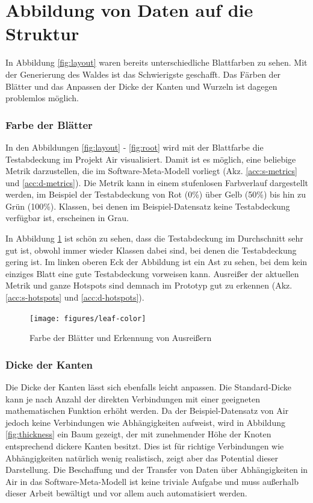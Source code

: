 \section{Abbildung von Daten auf die Struktur}
\label{sec:data}

In Abbildung \ref{fig:layout} waren bereits unterschiedliche Blattfarben zu sehen. Mit der Generierung des Waldes ist das Schwierigste geschafft. Das Färben der Blätter und das Anpassen der Dicke der Kanten und Wurzeln ist dagegen problemlos möglich.

\subsubsection*{Farbe der Blätter}

In den Abbildungen \ref{fig:layout} - \ref{fig:root} wird mit der Blattfarbe die Testabdeckung im Projekt Air visualisiert. Damit ist es möglich, eine beliebige Metrik darzustellen, die im Software-Meta-Modell vorliegt (Akz. \ref{acc:s-metrics} und \ref{acc:d-metrics}). Die Metrik kann in einem stufenlosen Farbverlauf dargestellt werden, im Beispiel der Testabdeckung von Rot (0\%) über Gelb (50\%) bis hin zu Grün (100\%). Klassen, bei denen im Beispiel-Datensatz keine Testabdeckung verfügbar ist, erscheinen in Grau.

In Abbildung \ref{fig:leaf-color} ist schön zu sehen, dass die Testabdeckung im Durchschnitt sehr gut ist, obwohl immer wieder Klassen dabei sind, bei denen die Testabdeckung gering ist. Im linken oberen Eck der Abbildung ist ein Ast zu sehen, bei dem kein einziges Blatt eine gute Testabdeckung vorweisen kann. Ausreißer der aktuellen Metrik und ganze Hotspots sind demnach im Prototyp gut zu erkennen (Akz. \ref{acc:s-hotspots} und \ref{acc:d-hotspots}).

\begin{figure}[htb]
  \texttt{[image: figures/leaf-color]}
  \caption{Farbe der Blätter und Erkennung von Ausreißern}
  \label{fig:leaf-color}
\end{figure}

\subsubsection*{Dicke der Kanten}

Die Dicke der Kanten lässt sich ebenfalls leicht anpassen. Die Standard-Dicke kann je nach Anzahl der direkten Verbindungen mit einer geeigneten mathematischen Funktion erhöht werden. Da der Beispiel-Datensatz von Air jedoch keine Verbindungen wie Abhängigkeiten aufweist, wird in Abbildung \ref{fig:thickness} ein Baum gezeigt, der mit zunehmender Höhe der Knoten entsprechend dickere Kanten besitzt. Dies ist für richtige Verbindungen wie Abhängigkeiten natürlich wenig realistisch, zeigt aber das Potential dieser Darstellung. Die Beschaffung und der Transfer von Daten über Abhängigkeiten in Air in das Software-Meta-Modell ist keine triviale Aufgabe und muss außerhalb dieser Arbeit bewältigt und vor allem auch automatisiert werden.

